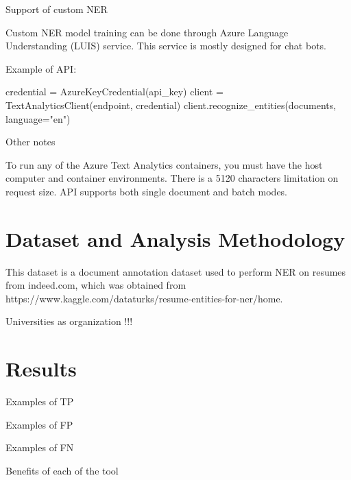 \documentclass[conference]{IEEEtran}
\begin{document}
Support of custom NER

Custom NER model training can be done through  Azure Language Understanding (LUIS) service. This service is mostly designed for chat bots.

Example of API:

\begin{verbatimtab}[4]
credential = AzureKeyCredential(api_key)
client = TextAnalyticsClient(endpoint, 
	credential)
client.recognize_entities(documents,
	 language="en")
\end{verbatimtab}

Other notes

To run any of the Azure Text Analytics containers, you must have the host computer and container environments. There is a 5120 characters limitation on request size.  API supports both single document and batch modes.

\section{Dataset and Analysis Methodology}

This dataset is a document annotation dataset used to perform NER on resumes from indeed.com, which was obtained from https://www.kaggle.com/dataturks/resume-entities-for-ner/home.

Universities as organization !!!


\section{Results}

Examples of TP

Examples of FP

Examples of FN

Benefits of each of the tool
\end{document}
